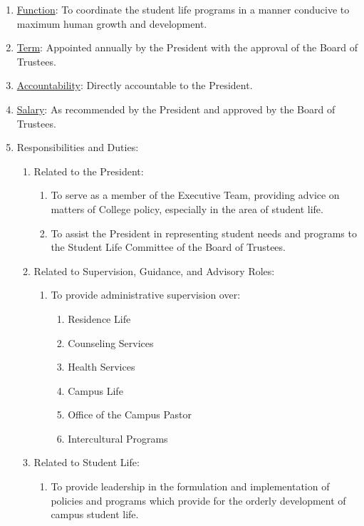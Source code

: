 					\begin{enumerate}
						\item{\underline{Function}: To coordinate the student life programs in a manner conducive to maximum human growth and development.}
						\item{\underline{Term}: Appointed annually by the President with the approval of the Board of Trustees.}
						\item{\underline{Accountability}: Directly accountable to the President.}
						\item{\underline{Salary}: As recommended by the President and approved by the Board of Trustees.}
						\item{Responsibilities and Duties:
							\begin{enumerate}
								\item{Related to the President:
									\begin{enumerate}
										\item{To serve as a member of the Executive Team, providing advice on matters of College policy, especially in the area of student life.}
										\item{To assist the President in representing student needs and programs to the Student Life Committee of the Board of Trustees.}
									\end{enumerate}
								}
								\item{Related to Supervision, Guidance, and Advisory Roles:
									\begin{enumerate}
										\item{To provide administrative supervision over:
											\begin{enumerate}
												\item{Residence Life}
												\item{Counseling Services}
												\item{Health Services}
												\item{Campus Life}
												\item{Office of the Campus Pastor}
												\item{Intercultural Programs}
											\end{enumerate}
										}
									\end{enumerate}
								}
								\item{Related to Student Life:
									\begin{enumerate}
										\item{To provide leadership in the formulation and implementation of policies and programs which provide for the orderly development of campus student life.}

\end{enumerate}}
\end{enumerate}}
\end{enumerate}
